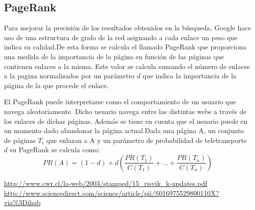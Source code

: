 \documentclass[a4paper, 11pt]{article} %
\begin{document}
		
		\subsection{PageRank}
		Para mejorar la precisión de los resultados obtenidos en la búsqueda, Google hace uso de una estructura de grafo de la red asignando a cada enlace un peso que indica su calidad.De esta forma se calcula el llamado PageRank que proporciona una medida de la importancia de la página en función de las páginas que contienen enlaces a la misma. Este valor se calcula sumando el número de enlaces a la pagina normalizados por un parámetro $d$ que indica la importancia de la página de la que procede el enlace.

		El PageRank puede interpretarse como el comportamiento de un usuario que navega aleatoriamente. Dicho usuario navega entre las distintas webs a través de los enlaces de dichas páginas. Además se tiene en cuenta que el usuario puede en un momento dado abandonar la página actual.Dada una página A, un conjunto de páginas $T_i$ que enlazan a A y un parámetro de probabilidad de teletransporte $d$ su PageRank se calcula como:\\
		\[
		 PR(A)=(1-d)+d(\frac{PR(T_1)}{C(T_1)}+...+\frac{PR(T_n)}{C(T_n)})
		\]
	\begin{thebibliography}{9}

		 \url{http://www.cwr.cl/la-web/2003/stamped/15_risvik_k-updates.pdf}
		 \url{http://www.sciencedirect.com/science/article/pii/S016975529800110X?via\%3Dihub}

	\end{thebibliography}
\end{document}
